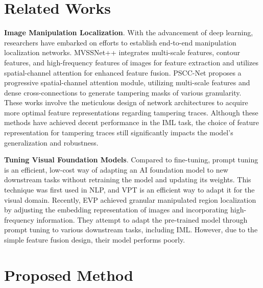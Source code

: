 \documentclass{article}
\begin{document}
\section{Related Works}
\textbf{Image Manipulation Localization}. With the advancement of deep learning, researchers have embarked on efforts to establish end-to-end manipulation localization networks. 
MVSSNet++\cite{MVSS-Net++} integrates multi-scale features, contour features, and high-frequency features of images for feature extraction and utilizes spatial-channel attention for enhanced feature fusion. PSCC-Net\cite{PSCC} proposes a progressive spatial-channel attention module, utilizing multi-scale features and dense cross-connections to generate tampering masks of various granularity. These works involve the meticulous design of network architectures to acquire more optimal feature representations regarding tampering traces. Although these methods have achieved decent performance in the IML task, the choice of feature representation for tampering traces still significantly impacts the model's generalization and robustness.

\noindent\textbf{Tuning Visual Foundation Models}. Compared to fine-tuning, prompt tuning is an efficient, low-cost way of adapting an AI foundation model to new downstream tasks without retraining the model and updating its weights. This technique was first used in NLP, and VPT\cite{VPT} is an efficient way to adapt it for the visual domain. Recently, EVP\cite{EVP} achieved granular manipulated region localization by adjusting the embedding representation of images and incorporating high-frequency information. They attempt to adapt the pre-trained model through prompt tuning to various downstream tasks, including IML. However, due to the simple feature fusion design, their model performs poorly. 


\section{Proposed Method}
\end{document}
